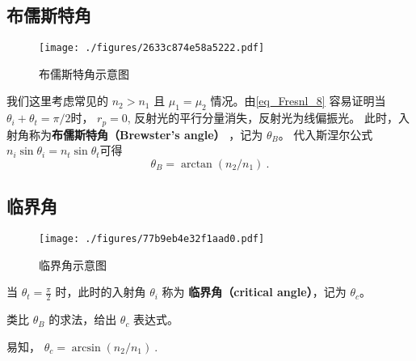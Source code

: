 \subsection{布儒斯特角}
\begin{figure}[ht]
\centering
\texttt{[image: ./figures/2633c874e58a5222.pdf]}
\caption{布儒斯特角示意图} \label{fig_Fresnl_2}
\end{figure}
我们这里考虑常见的 $n_2>n_1$ 且 $\mu_1 = \mu_2$ 情况。由\autoref{eq_Fresnl_8} 容易证明当 $\theta_i + \theta_t = \pi/2$时， $r_p = 0$, 反射光的平行分量消失，反射光为线偏振光。 此时，入射角称为\textbf{布儒斯特角（Brewster's angle）} ，记为 $\theta_B$。 代入斯涅尔公式 $n_i\sin\theta_i = n_t\sin\theta_t$可得
\begin{equation}
\theta_B = \arctan (n_2/n_1)~.
\end{equation}

\subsection{临界角}
\begin{figure}[ht]
\centering
\texttt{[image: ./figures/77b9eb4e32f1aad0.pdf]}
\caption{临界角示意图} \label{fig_Fresnl_3}
\end{figure}
\begin{definition}{}
当 $\theta_t  = \frac{\pi}{2}$ 时，此时的入射角 $\theta_i$ 称为 \textbf{临界角（critical angle）}，记为 $\theta_c$。
\end{definition}

\begin{exercise}{}
类比 $\theta_B$ 的求法，给出 $\theta_c$ 表达式。
\end{exercise}

易知， $\theta_c = \arcsin(n_2/n_1)~.$


